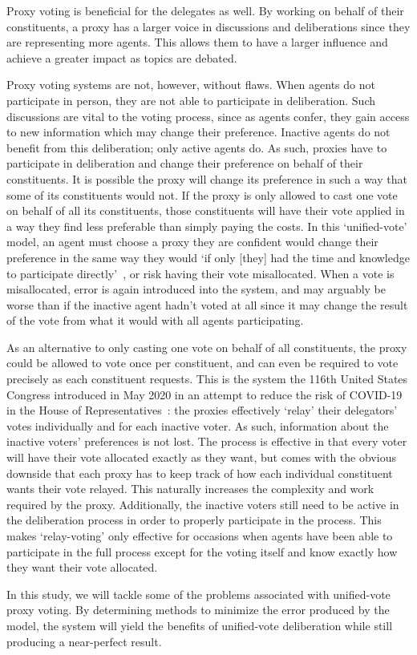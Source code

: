 Proxy voting is beneficial for the delegates as well.
By working on behalf of their constituents, a proxy has a larger voice in discussions
and deliberations since they are representing more agents.
This allows them to have a larger influence and achieve a greater impact as topics
are debated.

Proxy voting systems are not, however, without flaws.
When agents do not participate in person, they are not able to participate in
deliberation.
Such discussions are vital to the voting process, since as agents confer, they gain
access to new information which may change their preference.
Inactive agents do not benefit from this deliberation; only active agents do.
As such, proxies have to participate in deliberation and change their preference on
behalf of their constituents.
It is possible the proxy will change its preference in such a way that some of its
constituents would not.
If the proxy is only allowed to cast one vote on behalf of all its constituents, those
constituents will have their vote applied in a way they find less preferable than
simply paying the costs.
In this `unified-vote' model, an agent must choose a proxy they are confident would
change their preference in the same way they would `if only [they] had the time and
knowledge to participate directly'~\cite{Miller1969}, or risk having their vote
misallocated.
When a vote is misallocated, error is again introduced into the system, and may
arguably be worse than if the inactive agent hadn't voted at all since it may change
the result of the vote from what it would with all agents participating.

As an alternative to only casting one vote on behalf of all constituents, the proxy
could be allowed to vote once per constituent, and can even be required to vote
precisely as each constituent requests.
This is the system the 116th United States Congress introduced in May 2020 in an
attempt to reduce the risk of COVID-19 in the House of
Representatives~\cite{CERP2020, Congress.gov2020}: the proxies effectively `relay' their
delegators' votes individually and for each inactive voter.
As such, information about the inactive voters' preferences is not lost.
The process is effective in that every voter will have their vote allocated exactly
as they want, but comes with the obvious downside that each proxy has to keep track
of how each individual constituent wants their vote relayed.
This naturally increases the complexity and work required by the proxy.
Additionally, the inactive voters still need to be active in the deliberation process
in order to properly participate in the process.
This makes `relay-voting' only effective for occasions when agents have been able to
participate in the full process except for the voting itself and know exactly how
they want their vote allocated.

In this study, we will tackle some of the problems associated with unified-vote proxy
voting.
By determining methods to minimize the error produced by the model, the system will
yield the benefits of unified-vote deliberation while still producing a near-perfect
result.
